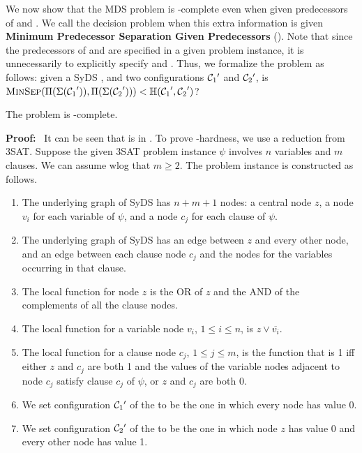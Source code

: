 We now show that the MDS problem is \cnp-complete
even when given predecessors of \calcone{} and \calctwo{}.
We call the decision problem when this extra information is given
\textbf{Minimum Predecessor Separation Given Predecessors} (\mpsgp).
Note that since the predecessors of \calcone{} and \calctwo{}
are specified in a given \mpsgp{} problem instance, 
it is unnecessarily to explicitly specify \calcone{} and \calctwo{}.
Thus, we formalize the \mpsgp{} problem as follows:
 given a SyDS \cals{}, and two configurations $\mbox{$\mathcal{C}_{1}$}{} '$ and $\mbox{$\mathcal{C}_{2}$}{}'$,
is 
$\mbox{\textsc{MinSep}}(\Pi(\Sigma(\mbox{$\mathcal{C}_{1}$}')), \Pi(\Sigma(\mbox{$\mathcal{C}_{2}$}'))) < \mbox{$\mathbb{H}$}(\mbox{$\mathcal{C}_{1}$}', \mbox{$\mathcal{C}_{2}$}')$?

\begin{proposition}\label{pro:minsep-gp-hard}
The \mpsgp{} problem is \cnp-complete.
\end{proposition}

\noindent
\textbf{Proof:}~ 
 It can be seen that \mpsgp{} is in \cnp.
To prove \cnp-hardness,
we use a reduction from 3SAT.
Suppose the given 3SAT problem instance $\psi$ involves $n$ variables and $m$ clauses.
We can assume wlog that $m \geq 2$.
The  \mpsgp{} problem instance is constructed as follows.
\begin{enumerate}
\item The underlying graph of SyDS \cals{} has $n+m+1$ nodes: a central node $z$,
a node $v_i$ for each variable of $\psi$,
and a node $c_j$ for each clause of $\psi$.
\item The underlying graph of SyDS \cals{} 
has an edge between $z$ and every other node,
and an edge between each clause node $c_j$ 
and the nodes for the variables occurring in that clause.
\item The local function for node $z$ is 
the OR of $z$ and the AND of the complements of all the clause nodes.
\item The local function for a variable node $v_i$, $1 \leq i \leq n$, is 
 $z \vee \overline{v_i}$.
\item The local function for a clause node $c_j$, $1 \leq j \leq m$, is 
 the function that is 1 iff either $z$ and $c_j$ are both 1
  and the values of the variable nodes adjacent to node $c_j$
 satisfy clause $c_j$ of $\psi$,
 or $z$ and $c_j$ are both 0.
\item We set configuration $\mbox{$\mathcal{C}_{1}$}{}'$ of the \mpsgp{} to be the one in which
every node has value 0.
\item We set configuration $\mbox{$\mathcal{C}_{2}$}{}'$ of the \mpsgp{} to be the one in which
node $z$ has value 0 and every other node has value 1.
\end{enumerate}

